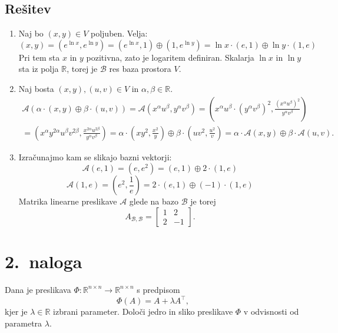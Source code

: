 \documentclass[a4,11pt]{article}
\newcommand{\R}{\mathbb{R}}
\begin{document}
\subsection*{Rešitev}
    \begin{enumerate}[label=(\alph*)]
        \item Naj bo \((x, y) \in V\) poljuben. Velja:
        \[(x, y) = \left(e^{\ln{x}}, e^{\ln{y}}\right) = \left(e^{\ln{x}}, 1\right) \oplus \left(1, e^{\ln{y}}\right) = \ln{x} \cdot (e, 1) \oplus \ln{y} \cdot (1, e)\]
        Pri tem sta \(x\) in \(y\) pozitivna, zato je logaritem definiran. Skalarja \(\ln x\) in \(\ln y\) sta iz polja \(\R\), torej je \(\mathcal{B}\) res baza prostora \(V\).
        
        \item Naj bosta \(\left(x, y\right), \left(u, v\right) \in V\) in \(\alpha, \beta \in \R\). 
        \begin{multline*}
            \mathcal{A}\left(\alpha \cdot \left(x, y\right) \oplus \beta \cdot \left(u, v\right)\right) =  
            \mathcal{A}\left(x^\alpha u^\beta, y^\alpha v^\beta\right) = \left(x^\alpha u^\beta \cdot \left(y^\alpha v^\beta\right)^2, \frac{\left(x^\alpha u^\beta\right)^2}{y^\alpha v^\beta}\right) \\
            = \left(x^\alpha y^{2\alpha}u^{\beta}v^{2\beta}, \frac{x^{2\alpha}u^{2\beta}}{y^\alpha v^\beta}\right)
            = \alpha \cdot \left(xy^2, \frac{x^2}{y}\right) \oplus \beta \cdot \left(uv^2, \frac{u^2}{v}\right)
            = \alpha \cdot \mathcal{A}\left(x, y\right) \oplus \beta \cdot \mathcal{A}\left(u, v\right).
        \end{multline*}

        \item Izračunajmo kam se slikajo bazni vektorji:
        \[\mathcal{A}\left(e, 1\right) = \left(e, e^2\right) = \left(e, 1\right) \oplus 2 \cdot \left(1, e\right)\]
        \[\mathcal{A}\left(1, e\right) = \left(e^2, \frac{1}{e}\right) = 2\cdot\left(e, 1\right) \oplus \left(-1\right)\cdot\left(1, e\right)\]
        Matrika linearne preslikave \(\mathcal{A}\) glede na bazo \(\mathcal{B}\) je torej
        \[A_{\mathcal{B},\mathcal{B}} = \begin{bmatrix}
            1 & 2 \\
            2 & -1
        \end{bmatrix}.\]
    \end{enumerate}

\section*{2.~naloga}
    Dana je preslikava \(\Phi: \R^{n \times n} \to \R^{n \times n}\) s predpisom
    \[\Phi\left(A\right) = A + \lambda A ^ \top,\]
    kjer je \(\lambda \in \R\) izbrani parameter. Določi jedro in sliko preslikave \(\Phi\) v odvisnosti od parametra \(\lambda\).
\end{document}

